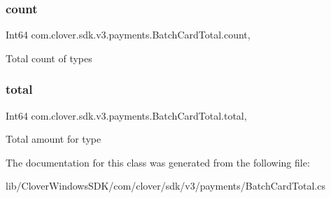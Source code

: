 \subsubsection{\texorpdfstring{count}{count}}
{\footnotesize\ttfamily Int64 com.\+clover.\+sdk.\+v3.\+payments.\+Batch\+Card\+Total.\+count\hspace{0.3cm}{\ttfamily [get]}, {\ttfamily [set]}}



Total count of types 

\mbox{\label{classcom_1_1clover_1_1sdk_1_1v3_1_1payments_1_1_batch_card_total_a7dff34fb76e90d7e78ca8031b03913b3}} 
\subsubsection{\texorpdfstring{total}{total}}
{\footnotesize\ttfamily Int64 com.\+clover.\+sdk.\+v3.\+payments.\+Batch\+Card\+Total.\+total\hspace{0.3cm}{\ttfamily [get]}, {\ttfamily [set]}}



Total amount for type 



The documentation for this class was generated from the following file\+:\begin{DoxyCompactItemize}
\item 
lib/\+Clover\+Windows\+S\+D\+K/com/clover/sdk/v3/payments/Batch\+Card\+Total.\+cs\end{DoxyCompactItemize}
